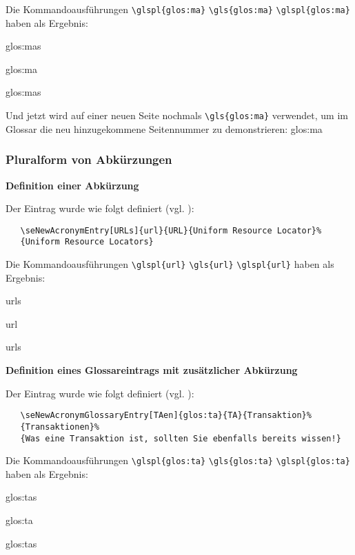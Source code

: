 Die Kommandoausf\"uhrungen \verb+\glspl{glos:ma}+ \verb+\gls{glos:ma}+  \verb+\glspl{glos:ma}+ haben als 
Ergebnis:

\begin{seList}
\item \glspl{glos:ma}
\item \gls{glos:ma}
\item \glspl{glos:ma}
\end{seList}

\newpage
Und jetzt wird auf einer neuen Seite nochmals \verb+\gls{glos:ma}+ verwendet, um im Glossar die neu hinzugekommene 
Seitennummer zu demonstrieren: \gls{glos:ma}

\subsubsection{Pluralform von Abk\"urzungen}

\textbf{\textsf{Definition einer Abk\"urzung}}

Der Eintrag wurde wie folgt definiert (vgl. \dateiAbk{}):

\vspace{-\baselineskip}
\begin{verbatim}
   \seNewAcronymEntry[URLs]{url}{URL}{Uniform Resource Locator}%
   {Uniform Resource Locators}
\end{verbatim}
\vspace{-\baselineskip}

Die Kommandoausf\"uhrungen \verb+\glspl{url}+ \verb+\gls{url}+  \verb+\glspl{url}+ haben als 
Ergebnis:

\begin{seList}
\item \glspl{url}
\item \gls{url}
\item \glspl{url}
\end{seList}

\seVsd
\textbf{\textsf{Definition eines Glossareintrags mit zus\"atzlicher Abk\"urzung}}

Der Eintrag wurde wie folgt definiert (vgl. \dateiAbk{}):

\vspace{-\baselineskip}
\begin{verbatim}
   \seNewAcronymGlossaryEntry[TAen]{glos:ta}{TA}{Transaktion}%
   {Transaktionen}%
   {Was eine Transaktion ist, sollten Sie ebenfalls bereits wissen!}
\end{verbatim}
\vspace{-\baselineskip}


Die Kommandoausf\"uhrungen \verb+\glspl{glos:ta}+ \verb+\gls{glos:ta}+  \verb+\glspl{glos:ta}+ haben als 
Ergebnis:

\begin{seList}
\item \glspl{glos:ta}
\item \gls{glos:ta}
\item \glspl{glos:ta}
\end{seList}

\newpage

 